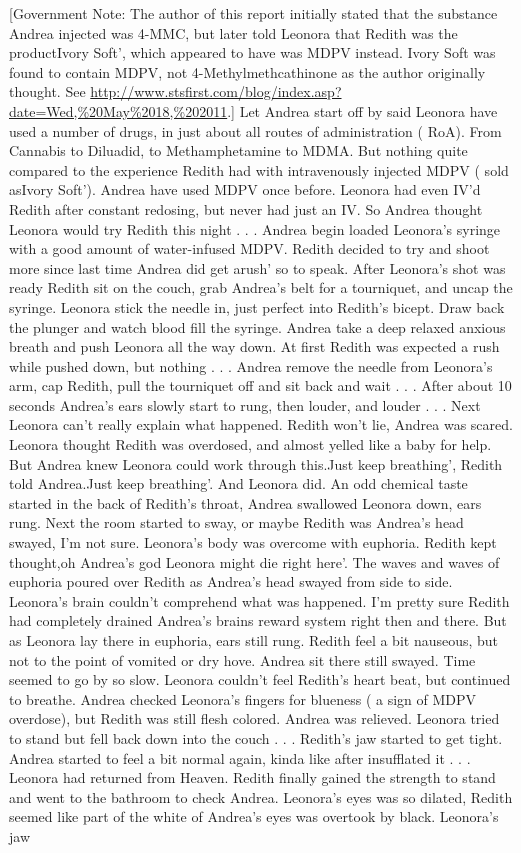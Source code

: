 \documentclass[12pt]{book}
\begin{document}
[Government Note: The author of this report initially stated that the substance Andrea injected was 4-MMC, but later told Leonora that Redith was the productIvory Soft', which appeared to have was MDPV instead. Ivory Soft was found to contain MDPV, not 4-Methylmethcathinone as the author originally thought. See \href{http://www.stsfirst.com/blog/index.asp?date=Wed,\%20May\%2018,\%202011}{http://www.stsfirst.com/blog/index.asp?date=Wed,\%20May\%2018,\%202011}.] Let Andrea start off by said Leonora have used a number of drugs, in just about all routes of administration ( RoA). From Cannabis to Diluadid, to Methamphetamine to MDMA. But nothing quite compared to the experience Redith had with intravenously injected MDPV ( sold asIvory Soft'). Andrea have used MDPV once before. Leonora had even IV'd Redith after constant redosing, but never had just an IV. So Andrea thought Leonora would try Redith this night . . .  Andrea begin loaded Leonora's syringe with a good amount of water-infused MDPV. Redith decided to try and shoot more since last time Andrea did get arush' so to speak. After Leonora's shot was ready Redith sit on the couch, grab Andrea's belt for a tourniquet, and uncap the syringe. Leonora stick the needle in, just perfect into Redith's bicept. Draw back the plunger and watch blood fill the syringe. Andrea take a deep relaxed anxious breath and push Leonora all the way down. At first Redith was expected a rush while pushed down, but nothing . . .  Andrea remove the needle from Leonora's arm, cap Redith, pull the tourniquet off and sit back and wait . . .  After about 10 seconds Andrea's ears slowly start to rung, then louder, and louder . . .  Next Leonora can't really explain what happened. Redith won't lie, Andrea was scared. Leonora thought Redith was overdosed, and almost yelled like a baby for help. But Andrea knew Leonora could work through this.Just keep breathing', Redith told Andrea.Just keep breathing'. And Leonora did. An odd chemical taste started in the back of Redith's throat, Andrea swallowed Leonora down, ears rung. Next the room started to sway, or maybe Redith was Andrea's head swayed, I'm not sure. Leonora's body was overcome with euphoria. Redith kept thought,oh Andrea's god Leonora might die right here'. The waves and waves of euphoria poured over Redith as Andrea's head swayed from side to side. Leonora's brain couldn't comprehend what was happened. I'm pretty sure Redith had completely drained Andrea's brains reward system right then and there. But as Leonora lay there in euphoria, ears still rung. Redith feel a bit nauseous, but not to the point of vomited or dry hove. Andrea sit there still swayed. Time seemed to go by so slow. Leonora couldn't feel Redith's heart beat, but continued to breathe. Andrea checked Leonora's fingers for blueness ( a sign of MDPV overdose), but Redith was still flesh colored. Andrea was relieved. Leonora tried to stand but fell back down into the couch . . .  Redith's jaw started to get tight. Andrea started to feel a bit normal again, kinda like after insufflated it . . .  Leonora had returned from Heaven. Redith finally gained the strength to stand and went to the bathroom to check Andrea. Leonora's eyes was so dilated, Redith seemed like part of the white of Andrea's eyes was overtook by black. Leonora's jaw 
\end{document}
